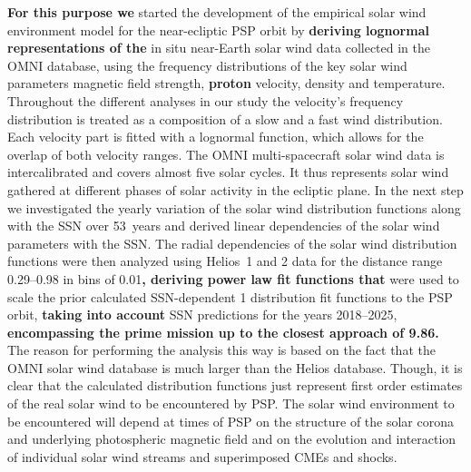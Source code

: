 \textbf{For this purpose we} started the development of the empirical solar wind environment model for the near-ecliptic PSP orbit by \textbf{deriving lognormal representations of the} in situ near-Earth solar wind data collected in the OMNI database, using the frequency distributions of the key solar wind parameters magnetic field strength, \textbf{proton} velocity, density and temperature. Throughout the different analyses in our study the velocity's frequency distribution is treated as a composition of a slow and a fast wind distribution. Each velocity part is fitted with a lognormal function, which allows for the overlap of both velocity ranges. The OMNI multi-spacecraft solar wind data is intercalibrated and covers almost five solar cycles. It thus represents solar wind gathered at different phases of solar activity in the ecliptic plane. In the next step we investigated the yearly variation of the solar wind distribution functions along with the SSN over 53~years and derived linear dependencies of the solar wind parameters with the SSN. The radial dependencies of the solar wind distribution functions were then analyzed using Helios~1 and 2 data for the distance range \SIrange{0.29}{0.98}{\au} in bins of \SI{0.01}{\au}\textbf{, deriving power law fit functions that} were used to scale the prior calculated SSN-dependent \SI{1}{\au} distribution fit functions to the PSP orbit, \textbf{taking into account} SSN predictions for the years 2018--2025, \textbf{encompassing the prime mission up to the closest approach of \SI{9.86}{\Rs}.} The reason for performing the analysis this way is based on the fact that the OMNI solar wind database is much larger than the Helios database. Though, it is clear that the calculated distribution functions just represent first order estimates of the real solar wind to be encountered by PSP. The solar wind environment to be encountered will depend at times of PSP on the structure of the solar corona and underlying photospheric magnetic field and on the evolution and interaction of individual solar wind streams and superimposed CMEs and shocks.

